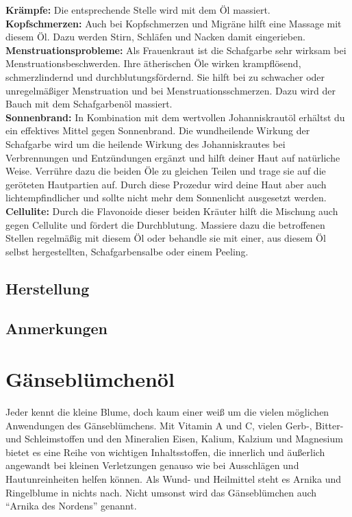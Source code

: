 \textbf{Krämpfe:} Die entsprechende Stelle wird mit dem Öl massiert.\\ 

\textbf{Kopfschmerzen:} Auch bei Kopfschmerzen und Migräne hilft eine Massage mit diesem Öl. Dazu werden Stirn, Schläfen und Nacken damit eingerieben. \\

\textbf{Menstruationsprobleme:} Als Frauenkraut ist die Schafgarbe sehr wirksam bei Menstruationsbeschwerden. Ihre ätherischen Öle wirken krampflösend, schmerzlindernd und durchblutungsfördernd. Sie hilft bei zu schwacher oder unregelmäßiger Menstruation und bei Menstruationsschmerzen. Dazu wird der Bauch mit dem Schafgarbenöl massiert.\\ 

\textbf{Sonnenbrand:} In Kombination mit dem wertvollen Johanniskrautöl erhältst du ein effektives Mittel gegen Sonnenbrand. Die wundheilende Wirkung der Schafgarbe wird um die heilende Wirkung des Johanniskrautes bei Verbrennungen und Entzündungen ergänzt und hilft deiner Haut auf natürliche Weise. Verrühre dazu die beiden Öle zu gleichen Teilen und trage sie auf die geröteten Hautpartien auf. Durch diese Prozedur wird deine Haut aber auch lichtempfindlicher und sollte nicht mehr dem Sonnenlicht ausgesetzt werden.\\ 

\textbf{Cellulite:} Durch die Flavonoide dieser beiden Kräuter hilft die Mischung auch gegen Cellulite und fördert die Durchblutung. Massiere dazu die betroffenen Stellen regelmäßig mit diesem Öl oder behandle sie mit einer, aus diesem Öl selbst hergestellten, Schafgarbensalbe oder einem Peeling. \\


\subsection{Herstellung}

\subsection{Anmerkungen}






\section{Gänseblümchenöl}

Jeder kennt die kleine Blume, doch kaum einer weiß um die vielen möglichen Anwendungen des Gänseblümchens. Mit Vitamin A und C, vielen Gerb-, Bitter- und Schleimstoffen und den Mineralien Eisen, Kalium, Kalzium und Magnesium bietet es eine Reihe von wichtigen Inhaltsstoffen, die innerlich und äußerlich angewandt bei kleinen Verletzungen genauso wie bei Ausschlägen und Hautunreinheiten helfen können. Als Wund- und Heilmittel steht es Arnika und Ringelblume in nichts nach. Nicht umsonst wird das Gänseblümchen auch “Arnika des Nordens” genannt.

